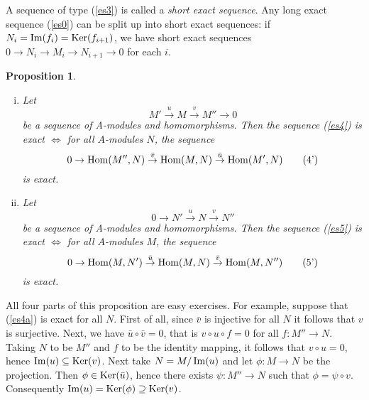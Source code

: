 \documentclass{standalone}
\newtheorem{proposition}[theorem]{Proposition}
\theoremstyle{definition}
\theoremstyle{remark}
\begin{document}
A sequence of type (\ref{es3}) is called a {\itshape short exact
  sequence}. Any long exact sequence (\ref{es0}) can be split up into
short exact sequences: if 
$N_{i}=\operatorname{Im}(f_{i})=\operatorname{Ker}(f_{i+1})$, we have short exact
sequences $0 \to N_{i} \to M_{i} \to N_{i+1} \to 0$ for each $i$.
\begin{proposition}
  \label{prop:2.9}
  \begin{enumerate}[i)]
  \item Let
    \begin{equation}
      \label{es4}
  M' \stackrel{u}{\to} M \stackrel{v}{\to} M'' \to 0\tag{4}
    \end{equation}
be a sequence of A-modules and homomorphisms. Then the sequence (\ref{es4}) is exact
$\iff$ for all $A$-modules $N$, the sequence
\begin{equation}
  \label{es4a}
  0 \to \operatorname{Hom}(M'', N) \stackrel{\bar{v}}{\to} \operatorname{Hom}(M, N) \stackrel{\bar{u}}{\to} \operatorname{Hom}(M', N)
  \tag{4'}
\end{equation}
is exact.
\item Let
  \begin{equation}
    \label{es5}
    0 \to N' \stackrel{u}{\to} N \stackrel{v}{\to} N''
    \tag{5}
  \end{equation}
be a sequence of A-modules and homomorphisms. Then the sequence (\ref{es5}) is exact
$\iff$ for all $A$-modules $M$, the sequence
\begin{equation}
  \label{es5a}
  0 \to \operatorname{Hom}(M, N') \stackrel{\bar{u}}{\to} \operatorname{Hom}(M, N) \stackrel{\bar{v}}{\to} \operatorname{Hom}(M, N'')
\tag{5'}
\end{equation}
is exact.
  \end{enumerate}
\end{proposition}
All four parts of this proposition are easy exercises. For example,
suppose that (\ref{es4a}) is exact for all $N$. First of all, since $\bar{v}$ is
injective for all $N$ it follows that $v$ is surjective. Next, we have
$\bar{u} \circ \bar{v}=0$, that is $v \circ u \circ f=0$ for all $f\colon M'' \to N$.
Taking $N$ to be $M''$ and $f$ to be the identity mapping, it follows that
$v \circ u=0$, hence $\operatorname{Im}(u) \subseteq \operatorname{Ker}(v)$. Next take $N=M / \operatorname{Im}(u)$ and
let $\phi\colon M \to N$ be the projection. Then $\phi \in \operatorname{Ker}(\bar{u})$, hence
there exists $\psi\colon M'' \to N$ such that $\phi=\psi \circ v$. Consequently
$\operatorname{Im}(u)=\operatorname{Ker}(\phi) \supseteq \operatorname{Ker}(v)$.\qedsymbol
\end{document}
